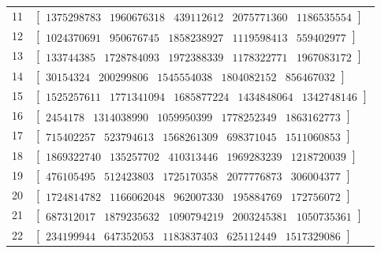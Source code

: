 \begin{longtable}{@{}cl@{}}
11 & $\begin{bmatrix}1375298783 & 1960676318 & 439112612 & 2075771360 & 1186535554\end{bmatrix}$ \\
12 & $\begin{bmatrix}1024370691 & 950676745 & 1858238927 & 1119598413 & 559402977\end{bmatrix}$ \\
13 & $\begin{bmatrix}133744385 & 1728784093 & 1972388339 & 1178322771 & 1967083172\end{bmatrix}$ \\
14 & $\begin{bmatrix}30154324 & 200299806 & 1545554038 & 1804082152 & 856467032\end{bmatrix}$ \\
15 & $\begin{bmatrix}1525257611 & 1771341094 & 1685877224 & 1434848064 & 1342748146\end{bmatrix}$ \\
16 & $\begin{bmatrix}2454178 & 1314038990 & 1059950399 & 1778252349 & 1863162773\end{bmatrix}$ \\
17 & $\begin{bmatrix}715402257 & 523794613 & 1568261309 & 698371045 & 1511060853\end{bmatrix}$ \\
18 & $\begin{bmatrix}1869322740 & 135257702 & 410313446 & 1969283239 & 1218720039\end{bmatrix}$ \\
19 & $\begin{bmatrix}476105495 & 512423803 & 1725170358 & 2077776873 & 306004377\end{bmatrix}$ \\
20 & $\begin{bmatrix}1724814782 & 1166062048 & 962007330 & 195884769 & 172756072\end{bmatrix}$ \\
21 & $\begin{bmatrix}687312017 & 1879235632 & 1090794219 & 2003245381 & 1050735361\end{bmatrix}$ \\
22 & $\begin{bmatrix}234199944 & 647352053 & 1183837403 & 625112449 & 1517329086\end{bmatrix}$ \\

\end{longtable}
